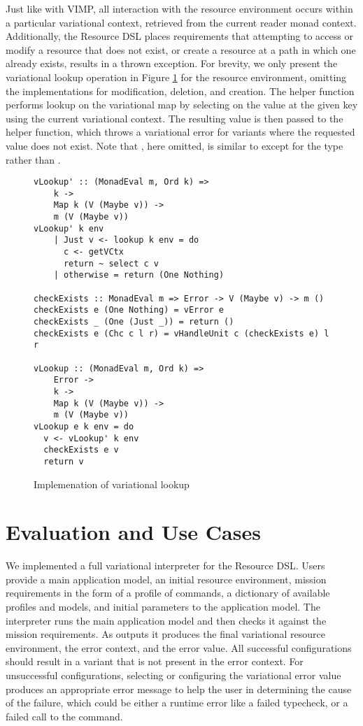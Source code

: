 \documentclass[12pt,oneside]{book}
\begin{document}
Just like with VIMP, all interaction with the resource environment occurs within a particular variational context, retrieved
from the current reader monad context.
Additionally, the Resource DSL places requirements that attempting to access or modify a resource that does not exist,
or create a resource at a path in which one already exists, results in a thrown exception. For brevity, we only present the
variational lookup operation in Figure \ref{fig:vLookup} for the resource environment, omitting the implementations for modification, deletion, and creation.
The helper function  performs lookup on the variational map by selecting on the value at the given key using the current variational
context. The resulting value is then passed to the  helper function, which throws a variational error for variants where the
requested value does not exist.
Note that , here omitted, is similar to  except for the type  rather than .

\begin{figure}
\begin{lstlisting}
vLookup' :: (MonadEval m, Ord k) =>
    k ->
    Map k (V (Maybe v)) ->
    m (V (Maybe v))
vLookup' k env
    | Just v <- lookup k env = do
      c <- getVCtx
      return ~ select c v
    | otherwise = return (One Nothing)

checkExists :: MonadEval m => Error -> V (Maybe v) -> m ()
checkExists e (One Nothing) = vError e
checkExists _ (One (Just _)) = return ()
checkExists e (Chc c l r) = vHandleUnit c (checkExists e) l r

vLookup :: (MonadEval m, Ord k) =>
    Error ->
    k ->
    Map k (V (Maybe v)) ->
    m (V (Maybe v))
vLookup e k env = do
  v <- vLookup' k env
  checkExists e v
  return v
\end{lstlisting}
\caption{Implemenation of variational lookup}
\label{fig:vLookup}
\end{figure}

\section{Evaluation and Use Cases}

We implemented a full variational interpreter for the Resource DSL. Users provide a main application
model, an initial resource environment, mission requirements in the form of a profile of 
commands, a dictionary of available profiles and models, and initial parameters to the application model.
The interpreter runs the main application model and then checks it against the mission requirements. 
As outputs it produces the final variational resource environment, the error context, and the error value.
All successful configurations should result in a variant that is not present in the error context. For unsuccessful
configurations, selecting or configuring the variational error value produces an appropriate error message
to help the user in determining the cause of the failure, which could be either a runtime error like a failed
typecheck, or a failed call to the  command.
\end{document}
